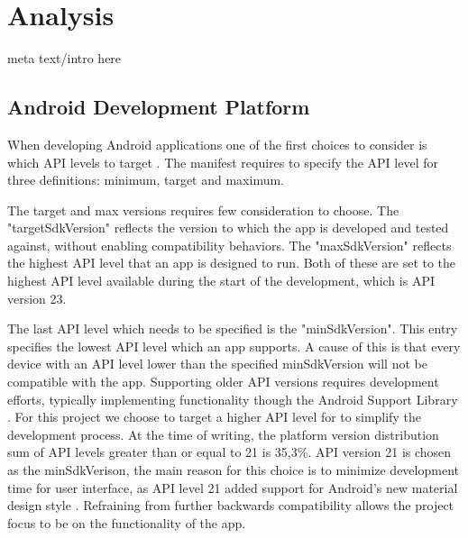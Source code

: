 \section{Analysis}
meta text/intro here
\subsection{Android Development Platform}
When developing Android applications one of the first choices to consider is which API levels to target \cite{usesSDK}.
The manifest requires to specify the API level for three definitions: minimum, target and maximum. 

The target and max versions requires few consideration to choose.
The "targetSdkVersion" reflects the version to which the app is developed and tested against, without enabling compatibility behaviors.
The "maxSdkVersion" reflects the highest API level that an app is designed to run.
Both of these are set to the highest API level available during the start of the development, which is API version 23.

The last API level which needs to be specified is the "minSdkVersion".
This entry specifies the lowest API level which an app supports.
A cause of this is that every device with an API level lower than the specified minSdkVersion will not be compatible with the app.
Supporting older API versions requires development efforts, typically implementing functionality though the Android Support Library \cite{androidSL}.
For this project we choose to target a higher API level for to simplify the development process.
At the time of writing, the platform version distribution sum of API levels greater than or equal to 21 is 35,3\%.
API version 21 is chosen as the minSdkVerison, the main reason for this choice is to minimize development time for user interface, as API level 21 added support for Android's new material design style \cite{android5API}. Refraining from further backwards compatibility allows the project focus to be on the functionality of the app. 